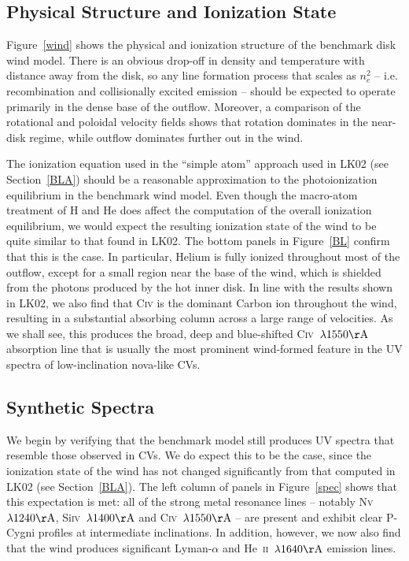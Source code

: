 \documentclass[preprint, a4paper, 11pt]{aastex}
\begin{document}
\subsection{Physical Structure and Ionization State}

Figure~\ref{wind} shows the physical and ionization structure 
of the benchmark disk wind model. There is an obvious drop-off in density
and temperature with distance away from the disk, so any line
formation process that scales as $n_e^2$ -- i.e. recombination and
collisionally excited emission -- should be expected to operate
primarily in the dense base of the outflow. Moreover, a comparison of
the rotational and poloidal velocity fields shows that rotation
dominates in the near-disk regime, while outflow dominates further out
in the wind. 

The ionization equation used in the ``simple atom'' approach used in
LK02 (see Section~\ref{BLA}) should be a reasonable approximation to
the photoionization equilibrium in the benchmark wind model. Even
though the macro-atom treatment of H and He does affect the 
computation of the overall ionization equilibrium, we would expect the
resulting ionization state of the wind to be quite similar to that
found in LK02. The bottom panels in Figure~\ref{BL} confirm that this
is the case. In particular, Helium is fully ionized
throughout most of the outflow, except for a small region near the
base of the wind, which is shielded from the photons produced by the
hot inner disk. In line with the results shown in LK02, we also find
that C\textsc{iv} is the dominant Carbon ion throughout the wind,
resulting in a substantial absorbing column across a large range of
velocities. As we shall see, this produces the broad, deep and
blue-shifted C\textsc{iv}~$\lambda 1550{\rm \AA}$ absorption line that
is usually the most prominent wind-formed feature in the UV spectra of
low-inclination nova-like CVs.

\subsection{Synthetic Spectra}

We begin by verifying that the benchmark model still produces UV
spectra that resemble those observed in CVs. We do expect this to be
the case, since the ionization state of the wind has not changed
significantly from that computed in LK02 (see Section~\ref{BLA}). The
left column of panels in Figure~\ref{spec} shows that this expectation
is met: all of the strong metal resonance
lines -- notably N\textsc{v}~$\lambda 1240{\rm \AA}$,
Si\textsc{iv}~$\lambda 1400{\rm \AA}$ and C\textsc{iv}~$\lambda
1550{\rm \AA}$ -- are present and exhibit clear P-Cygni profiles
at intermediate inclinations. In addition, however, we now also find
that the wind produces significant Lyman-$\alpha$ and
He~\textsc{ii}~$\lambda1640{\rm \AA}$ emission lines. 
\end{document}
